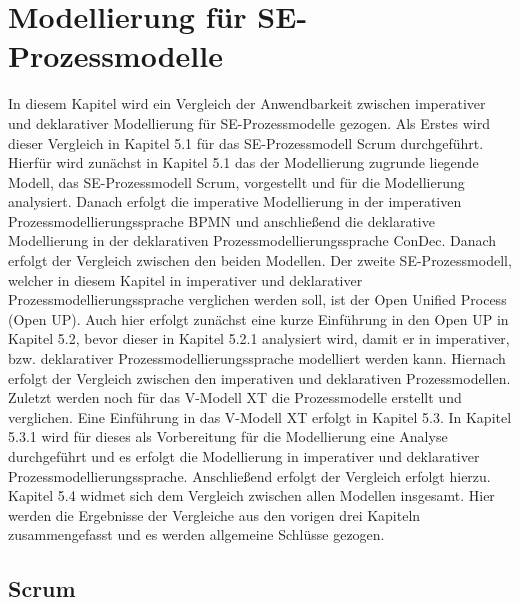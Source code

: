 \chapter{Modellierung für SE-Prozessmodelle}\label{sec:chapter6}
In diesem Kapitel wird ein Vergleich der Anwendbarkeit zwischen imperativer und deklarativer Modellierung für SE-Prozessmodelle gezogen. Als Erstes wird dieser Vergleich in Kapitel 5.1 für das SE-Prozessmodell Scrum durchgeführt. Hierfür wird zunächst in Kapitel 5.1 das der Modellierung zugrunde liegende Modell, das SE-Prozessmodell Scrum, vorgestellt und für die Modellierung analysiert. Danach erfolgt die imperative Modellierung in der imperativen Prozessmodellierungssprache BPMN und anschließend die deklarative Modellierung in der deklarativen Prozessmodellierungssprache ConDec. Danach erfolgt der Vergleich zwischen den beiden Modellen.\newline
Der zweite SE-Prozessmodell, welcher in diesem Kapitel in imperativer und deklarativer Prozessmodellierungssprache verglichen werden soll, ist der Open Unified Process (Open UP). Auch hier erfolgt zunächst eine kurze Einführung in den Open UP in Kapitel 5.2, bevor dieser in Kapitel 5.2.1 analysiert wird, damit er in imperativer, bzw. deklarativer Prozessmodellierungssprache modelliert werden kann. Hiernach erfolgt der Vergleich zwischen den imperativen und deklarativen Prozessmodellen.\newline
Zuletzt werden noch für das V-Modell XT die Prozessmodelle erstellt und verglichen. Eine Einführung in das V-Modell XT erfolgt in Kapitel 5.3. In Kapitel 5.3.1 wird für dieses als Vorbereitung für die Modellierung eine Analyse durchgeführt und es erfolgt die Modellierung in imperativer und deklarativer Prozessmodellierungssprache. Anschließend erfolgt der Vergleich erfolgt hierzu.\newline
Kapitel 5.4 widmet sich dem Vergleich zwischen allen Modellen insgesamt. Hier werden die Ergebnisse der Vergleiche aus den vorigen drei Kapiteln zusammengefasst und es werden allgemeine Schlüsse gezogen.\newline


\section{Scrum}\label{sec:chapter6:Imperative Modellierung}

